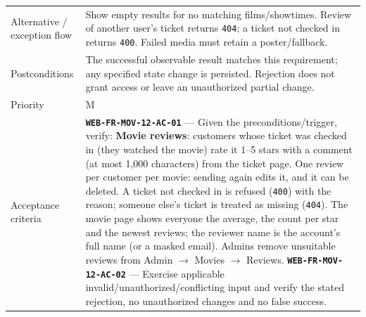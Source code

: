 \begin{longtable}{@{}P{0.23000\SRSWidth}P{0.77000\SRSWidth}@{}}
Alternative /\allowbreak{} exception flow & Show empty results for no matching films/\allowbreak{}showtimes. Review of another user’s ticket returns \texttt{404}; a ticket not checked in returns \texttt{400}. Failed media must retain a poster/\allowbreak{}fallback. \\[3pt]
Postconditions & The successful observable result matches this requirement; any specified state change is persisted. Rejection does not grant access or leave an unauthorized partial change. \\[3pt]
Priority & M \\[3pt]
Acceptance criteria & \textbf{\texttt{WEB-\allowbreak{}FR-\allowbreak{}MOV-\allowbreak{}12-\allowbreak{}AC-\allowbreak{}01}} — Given the preconditions/\allowbreak{}trigger, verify: \textbf{Movie reviews}: customers whose ticket was checked in (they watched the movie) rate it 1–5 stars with a comment (at most 1,000 characters) from the ticket page. One review per customer per movie: sending again edits it, and it can be deleted. A ticket not checked in is refused (\texttt{400}) with the reason; someone else's ticket is treated as missing (\texttt{404}). The movie page shows everyone the average, the count per star and the newest reviews; the reviewer name is the account's full name (or a masked email). Admins remove unsuitable reviews from Admin \ensuremath{\rightarrow} Movies \ensuremath{\rightarrow} Reviews. \textbf{\texttt{WEB-\allowbreak{}FR-\allowbreak{}MOV-\allowbreak{}12-\allowbreak{}AC-\allowbreak{}02}} — Exercise applicable invalid/\allowbreak{}unauthorized/\allowbreak{}conflicting input and verify the stated rejection, no unauthorized changes and no false success. \\[3pt]

\end{longtable}
